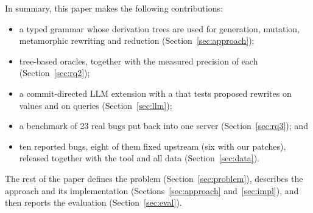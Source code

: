 In summary, this paper makes the following contributions:
\begin{itemize}
  \item a typed \pg grammar whose derivation trees are used for generation,
    mutation, metamorphic rewriting and reduction (Section~\ref{sec:approach});
  \item tree-based oracles, together with the measured precision of each
    (Section~\ref{sec:rq2});
  \item a commit-directed LLM extension with a \gate that tests proposed
    rewrites on values and on queries (Section~\ref{sec:llm});
  \item a benchmark of 23 real \pg bugs put back into one server
    (Section~\ref{sec:rq3}); and
  \item ten reported \pg bugs, eight of them fixed upstream (six with our
    patches), released together with the tool and all data
    (Section~\ref{sec:data}).
\end{itemize}
The rest of the paper defines the problem (Section~\ref{sec:problem}), describes
the approach and its implementation (Sections~\ref{sec:approach}
and~\ref{sec:impl}), and then reports the evaluation (Section~\ref{sec:eval}).

